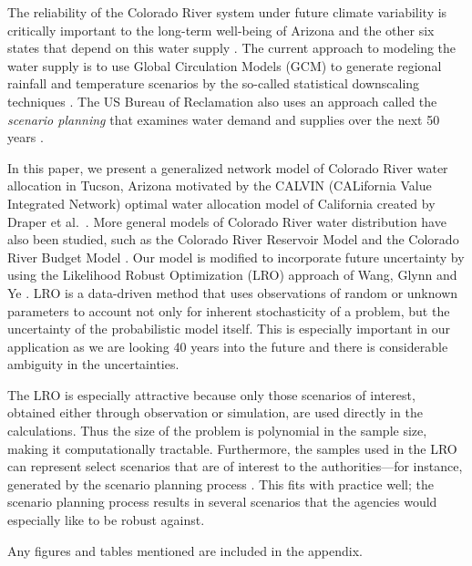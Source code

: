 \documentclass[12pt]{amsart}
\begin{document}
The reliability of the Colorado River system under future climate variability is critically important to the long-term well-being of Arizona and the other six states that depend on this water supply \cite{usbr_colorado_climate}. 
The current approach to modeling the water supply is to use Global Circulation Models (GCM) to generate regional rainfall and temperature scenarios by the so-called statistical downscaling techniques \cite{christensen_lettenmaier_07,dibike_caulibaly_05}.  
The US Bureau of Reclamation also uses an approach called the {\it scenario planning} that examines water demand and supplies over the next 50 years \cite{usbr_11}.

In this paper, we present a generalized network model of Colorado River water allocation in Tucson, Arizona motivated by the CALVIN (CALifornia Value Integrated Network) optimal water allocation model of California created by Draper et al.\ \cite{draper_etal_03}.
More general models of Colorado River water distribution have also been studied, such as the Colorado River Reservoir Model \cite{christensen2004effects} and the Colorado River Budget Model \cite{barnett2009sustainable}.
Our model is modified to incorporate future uncertainty by using the Likelihood Robust Optimization (LRO) approach of Wang, Glynn and Ye \cite{wang2010likelihood}.
LRO is a data-driven method that uses observations of random or unknown parameters to account not only for inherent stochasticity of a problem, but the uncertainty of the probabilistic model itself.
This is especially important in our application as we are looking 40 years into the future and there is considerable ambiguity in the uncertainties.

The LRO is especially attractive because only those scenarios of interest, obtained either through observation or simulation, are used directly in the calculations.
Thus the size of the problem is polynomial in the sample size, making it computationally tractable.
Furthermore, the samples used in the LRO can represent select scenarios that are of interest to the authorities---for instance, generated by the scenario planning process \cite{cityofTucsonWaterPlan,usbr_11}.
This fits with practice well; the scenario planning process results in several scenarios that the agencies would especially like to be robust against.

Any figures and tables mentioned are included in the appendix.

\end{document}

